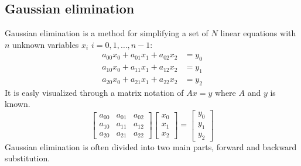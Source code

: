 \documentclass[twoside,twocolumn]{article}
\begin{document}
\subsection{Gaussian elimination}
Gaussian elimination is a method for simplifying a set of $N$ linear equations with $n$ unknown variables $x_i$ $i=0,1,\ldots,n-1$: 
\begin{align*}
a_{00}x_0+a_{01}x_1+a_{02}x_2&=y_0\\
a_{10}x_0+a_{11}x_1+a_{12}x_2&=y_1\\
a_{20}x_0+a_{21}x_1+a_{22}x_2&=y_2
\end{align*}
It is easly visualized through a matrix notation of $Ax = y$ where $A$ and $y$ is known.
\begin{equation}
\begin{bmatrix}
a_{00} & a_{01} & a_{02}\\
a_{10} & a_{11} & a_{12}\\
a_{20} & a_{21} & a_{22}
\end{bmatrix} 
\begin{bmatrix}
x_0 \\ x_1 \\ x_2
\end{bmatrix}=
\begin{bmatrix}
y_0 \\ y_1 \\ y_2
\end{bmatrix}
\end{equation}
Gaussian elimination is often divided into two main parts, forward and backward substitution.
\end{document}
